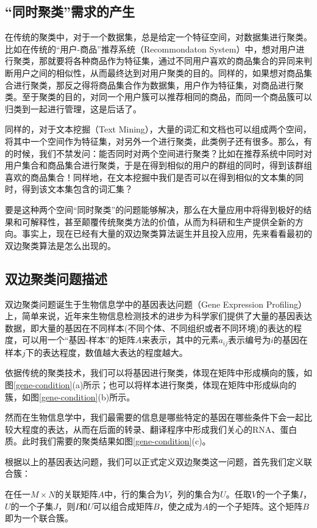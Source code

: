 \subsection{“同时聚类”需求的产生}
在传统的聚类中，对于一个数据集，总是给定一个特征空间，对数据集进行聚类。比如在传统的“用户-商品”推荐系统（Recommondaton System）中，想对用户进行聚类，那就要将各种商品作为特征集，通过不同用户喜欢的商品集合的异同来判断用户之间的相似性，从而最终达到对用户聚类的目的。同样的，如果想对商品集合进行聚类，那反之得将商品集合作为数据集，用户作为特征集，对商品进行聚类。至于聚类的目的，对同一个用户簇可以推荐相同的商品，而同一个商品簇可以归类到一起进行管理，这是后话了。

同样的，对于文本挖掘（Text Mining），大量的词汇和文档也可以组成两个空间，将其中一个空间作为特征集，对另外一个进行聚类，此类例子还有很多。那么，有的时候，我们不禁发问：能否同时对两个空间进行聚类？比如在推荐系统中同时对用户集合和商品集合进行聚类，于是在得到相似的用户的群组的同时，得到该群组喜欢的商品集合！同样地，在文本挖掘中我们是否可以在得到相似的文本集的同时，得到该文本集包含的词汇集？

要是这种两个空间“同时聚类”的问题能够解决，那么在大量应用中将得到极好的结果和可解释性，甚至颠覆传统聚类方法的价值，从而为科研和生产提供全新的方向。事实上，现在已经有大量的双边聚类算法诞生并且投入应用，先来看看最初的双边聚类算法是怎么出现的。

\subsection{双边聚类问题描述}
双边聚类问题诞生于生物信息学中的基因表达问题（Gene Expression Profiling）上，简单来说，近年来生物信息检测技术的进步为科学家们提供了大量的基因表达数据，即大量的基因在不同样本(不同个体、不同组织或者不同环境)的表达的程度，可以用一个“基因-样本”的矩阵$A$来表示，其中的元素$a_{ij}$表示编号为$i$的基因在样本$j$下的表达程度，数值越大表达的程度越大。

依据传统的聚类技术，我们可以将基因进行聚类，体现在矩阵中形成横向的簇，如图\ref{gene-condition}(a)所示；也可以将样本进行聚类，体现在矩阵中形成纵向的簇，如图\ref{gene-condition}(b)所示。


然而在生物信息学中，我们最需要的信息是哪些特定的基因在哪些条件下会一起比较大程度的表达，从而在后面的转录、翻译程序中形成我们关心的RNA、蛋白质。此时我们需要的聚类结果如图\ref{gene-condition}(c)。

根据以上的基因表达问题，我们可以正式定义双边聚类这一问题，首先我们定义联合簇：
\begin{dingyi}
\label{dingyi:bicluster}
在任一$M\times N$的关联矩阵$A$中，行的集合为$V$，列的集合为$U$。任取$V$的一个子集$I$，$U$的一个子集$J$，则$I$和$U$可以组合成矩阵$B$，使之成为$A$的一个子矩阵。这个矩阵$B$即为一个联合簇。
\end{dingyi}

